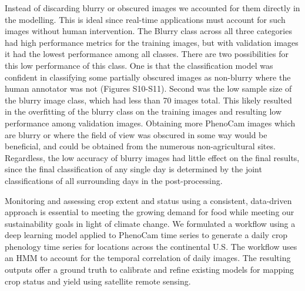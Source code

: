 \documentclass{article}
\begin{document}
Instead of discarding blurry or obscured images we accounted for them directly in the modelling. This is ideal since real-time applications must account for such images without human intervention. The Blurry class across all three categories had high performance metrics for the training images, but with validation images it had the lowest performance among all classes. There are two possibilities for this low performance of this class. One is that the classification model was confident in classifying some partially obscured images as non-blurry where the human annotator was not (Figures S10-S11). Second was the low sample size of the blurry image class, which had less than 70 images total. This likely resulted in the overfitting of the blurry class on the training images and resulting low performance among validation images. Obtaining more PhenoCam images which are blurry or where the field of view was obscured in some way would be beneficial, and could be obtained from the numerous non-agricultural sites. Regardless, the low accuracy of blurry images had little effect on the final results, since the final classification of any single day is determined by the joint classifications of all surrounding days in the post-processing. 

Monitoring and assessing crop extent and status using a consistent, data-driven approach is essential to meeting the growing demand for food while meeting our sustainability goals in light of climate change. We formulated a workflow using a deep learning model applied to PhenoCam time series to generate a daily crop phenology time series for locations across the continental U.S. The workflow uses an HMM to account for the temporal correlation of daily images. The resulting outputs offer a ground truth to calibrate and refine existing models for mapping crop status and yield using satellite remote sensing. 
\end{document}
